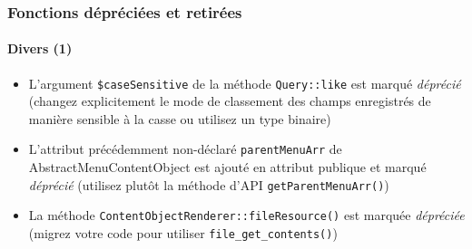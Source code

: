 \begin{frame}[fragile]
	\frametitle{Fonctions dépréciées et retirées}
	\framesubtitle{Divers (1)}


	\begin{itemize}

		\item L'argument \texttt{\$caseSensitive} de la méthode \texttt{Query::like}
			est marqué \textit{déprécié}\newline
			\smaller
				(changez explicitement le mode de classement des champs enregistrés de manière
				sensible à la casse ou utilisez un type binaire)
			\normalsize

		\item L'attribut précédemment non-déclaré \texttt{parentMenuArr} de AbstractMenuContentObject
			est ajouté en attribut publique et marqué \textit{déprécié}\newline
			\smaller
				(utilisez plutôt la méthode d'API \texttt{getParentMenuArr()})
			\normalsize

		\item La méthode \texttt{ContentObjectRenderer::fileResource()}
			est marquée \textit{dépréciée}\newline
			\smaller
				(migrez votre code pour utiliser \texttt{file\_get\_contents()})
			\normalsize

	\end{itemize}

\end{frame}





